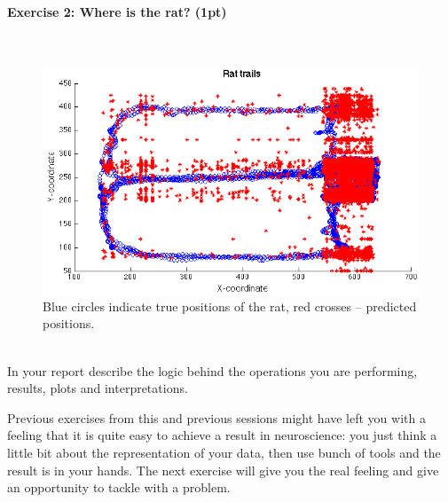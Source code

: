 \documentclass[a4paper,11pt]{article}
\newenvironment{exercise}[3]{\paragraph{Exercise #1: #2 (#3pt)}\ \\}{
\medskip}
\begin{document}
\begin{exercise}{2}{Where is the rat?}{1}
\begin{figure}[H]
   \centering
   \includegraphics[width=1\textwidth]{trails.png} 
   \caption{Blue circles indicate true positions of the rat, red crosses -- predicted positions.}
   \label{fig:mousetrail}
\end{figure}
\ \\
In your report describe the logic behind the operations you are performing, results, plots and interpretations.
\end{exercise}

\pagebreak

Previous exercises from this and previous sessions might have left you with a feeling that it is quite easy to achieve a result in neuroscience: you just think a little bit about the representation of your data, then use bunch of tools and the result is in your hands. The next exercise will give you the real feeling and give an opportunity to tackle with a problem.
\end{document}
